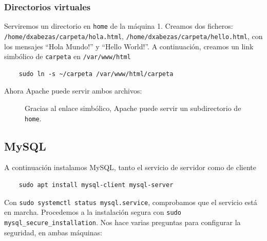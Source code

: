 \documentclass{article}
\begin{document}
\subsubsection{Directorios virtuales}

Serviremos un directorio en \texttt{home} de la máquina 1. Creamos dos ficheros: \texttt{/home/dxabezas/carpeta/hola.html},
\texttt{/home/dxabezas/carpeta/hello.html}, con los mensajes ``Hola Mundo!'' y ``Hello World!''. A continuación, creamos un link simbólico
 de \texttt{carpeta} en \texttt{/var/www/html}

\begin{lstlisting}
	sudo ln -s ~/carpeta /var/www/html/carpeta
\end{lstlisting}

Ahora Apache puede servir ambos archivos:

\begin{figure}[H]
	\centering
	\caption{Gracias al enlace simbólico, Apache puede servir un subdirectorio de \texttt{home}.}
	\label{fig:virtual}
\end{figure}

\subsection{MySQL}

A continuación instalamos MySQL, tanto el servicio de servidor como de cliente

\begin{verbatim}
	sudo apt install mysql-client mysql-server
\end{verbatim}
Con \texttt{sudo systemctl status mysql.service}, comprobamos que el servicio está en marcha. Procedemos a la instalación
segura con \texttt{sudo mysql\_secure\_installation}. Nos hace varias preguntas para configurar la seguridad, en ambas máquinas:
\end{document}
